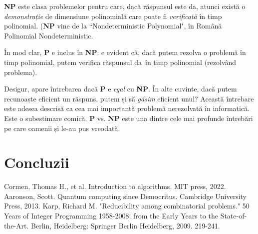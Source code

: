 \documentclass{article}
\begin{document}
\textbf{NP} este clasa problemelor pentru care, dacă răspunsul este \glqq
da\grqq, atunci există o \emph{demonstrație} de dimensiune polinomială care
poate fi \emph{verificată} în timp polinomial. (\textbf{NP} vine de la
``Nondeterministic Polynomial", în Română \glqq Polinomial Nondeterministic\grqq.

În mod clar, \textbf{P} e inclus în \textbf{NP}: e evident că, dacă putem
rezolva o problemă în timp polinomial, putem verifica răspunsul \glqq da\grqq \
în timp polinomial (rezolvând problema).

Desigur, apare întrebarea dacă \textbf{P} e \emph{egal} cu \textbf{NP}. În alte
cuvinte, dacă putem recunoaște eficient un răspuns, putem și să \emph{găsim}
eficient unul? Această întrebare este adesea descrisă ca \glqq cea mai importantă
problemă nerezolvată în informatică\grqq. Este o subestimare comică. \textbf{P}
vs. \textbf{NP} este una dintre cele mai profunde întrebări pe care oamenii și
le-au pus vreodată.



\section{Concluzii}

\begin{thebibliography}{ }
	Cormen, Thomas H., et al. Introduction to algorithms. MIT press, 2022.
	\bibitem{qcsd}
	Aaronson, Scott. Quantum computing since Democritus. Cambridge University Press, 2013.
	\bibitem{karp}
	Karp, Richard M. "Reducibility among combinatorial problems." 50 Years of Integer Programming 1958-2008: from the Early Years to the State-of-the-Art. Berlin, Heidelberg: Springer Berlin Heidelberg, 2009. 219-241.
\end{thebibliography}
\end{document}
